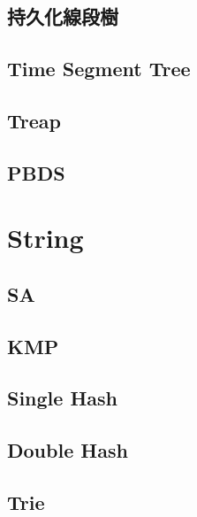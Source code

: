 \subsection{持久化線段樹}


\subsection{Time Segment Tree}


\subsection{Treap}


\subsection{PBDS}


\section{String}

\subsection{SA}


\subsection{KMP}


\subsection{Single Hash}


\subsection{Double Hash}


\subsection{Trie}


